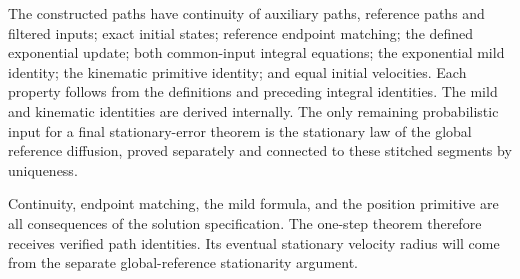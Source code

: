 \documentclass[11pt,a4paper]{article}
\begin{document}
The constructed paths have continuity of auxiliary paths, reference paths and filtered inputs; exact initial states; reference endpoint matching; the defined exponential update; both common-input integral equations; the exponential mild identity; the kinematic primitive identity; and equal initial velocities. Each property follows from the definitions and preceding integral identities. The mild and kinematic identities are derived internally. The only remaining probabilistic input for a final stationary-error theorem is the stationary law of the global reference diffusion, proved separately and connected to these stitched segments by uniqueness.



Continuity, endpoint matching, the mild formula, and the position primitive are all consequences of the solution specification. The one-step theorem therefore receives verified path identities. Its eventual stationary velocity radius will come from the separate global-reference stationarity argument.
\end{document}
